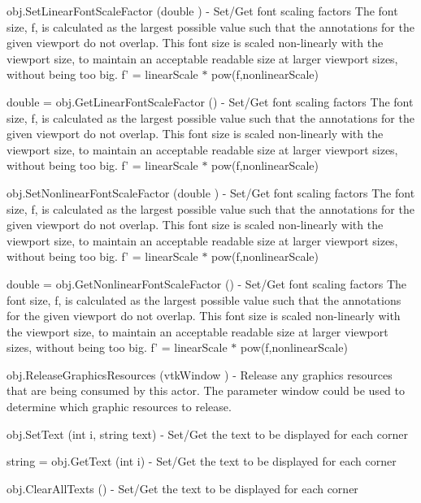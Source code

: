 \begin{DoxyItemize}
\item {\ttfamily obj.\-Set\-Linear\-Font\-Scale\-Factor (double )} -\/ Set/\-Get font scaling factors The font size, f, is calculated as the largest possible value such that the annotations for the given viewport do not overlap. This font size is scaled non-\/linearly with the viewport size, to maintain an acceptable readable size at larger viewport sizes, without being too big. f' = linear\-Scale $\ast$ pow(f,nonlinear\-Scale)  
\item {\ttfamily double = obj.\-Get\-Linear\-Font\-Scale\-Factor ()} -\/ Set/\-Get font scaling factors The font size, f, is calculated as the largest possible value such that the annotations for the given viewport do not overlap. This font size is scaled non-\/linearly with the viewport size, to maintain an acceptable readable size at larger viewport sizes, without being too big. f' = linear\-Scale $\ast$ pow(f,nonlinear\-Scale)  
\item {\ttfamily obj.\-Set\-Nonlinear\-Font\-Scale\-Factor (double )} -\/ Set/\-Get font scaling factors The font size, f, is calculated as the largest possible value such that the annotations for the given viewport do not overlap. This font size is scaled non-\/linearly with the viewport size, to maintain an acceptable readable size at larger viewport sizes, without being too big. f' = linear\-Scale $\ast$ pow(f,nonlinear\-Scale)  
\item {\ttfamily double = obj.\-Get\-Nonlinear\-Font\-Scale\-Factor ()} -\/ Set/\-Get font scaling factors The font size, f, is calculated as the largest possible value such that the annotations for the given viewport do not overlap. This font size is scaled non-\/linearly with the viewport size, to maintain an acceptable readable size at larger viewport sizes, without being too big. f' = linear\-Scale $\ast$ pow(f,nonlinear\-Scale)  
\item {\ttfamily obj.\-Release\-Graphics\-Resources (vtk\-Window )} -\/ Release any graphics resources that are being consumed by this actor. The parameter window could be used to determine which graphic resources to release.  
\item {\ttfamily obj.\-Set\-Text (int i, string text)} -\/ Set/\-Get the text to be displayed for each corner  
\item {\ttfamily string = obj.\-Get\-Text (int i)} -\/ Set/\-Get the text to be displayed for each corner  
\item {\ttfamily obj.\-Clear\-All\-Texts ()} -\/ Set/\-Get the text to be displayed for each corner  

\end{DoxyItemize}
